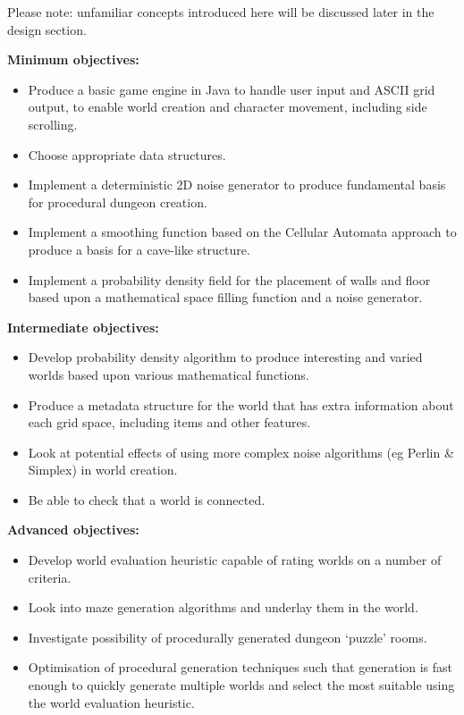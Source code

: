 \documentclass[12pt,a4paper]{article}
\begin{document}
Please note: unfamiliar concepts introduced here will be discussed later in the design section.

\textbf{Minimum objectives:}

\begin{itemize}%

	\item Produce a basic game engine in Java to handle user input and ASCII grid output, to enable world creation and character movement, including side scrolling.
	\item Choose appropriate data structures.
	\item Implement a deterministic 2D noise generator to produce fundamental basis for procedural dungeon creation.
	\item Implement a smoothing function based on the Cellular Automata approach to produce a basis for a cave-like structure.
	\item Implement a probability density field for the placement of walls and floor based upon a mathematical space filling function and a noise generator. 
\end{itemize}
\textbf{Intermediate objectives:}
\begin{itemize}
	\item Develop probability density algorithm to produce interesting and varied worlds based upon various mathematical functions.
	\item Produce a metadata structure for the world that has extra information about each grid space, including items and other features.
	\item Look at potential effects of using more complex noise algorithms (eg Perlin \& Simplex) in world creation.
	\item Be able to check that a world is connected.
\end{itemize}
\textbf{Advanced objectives:}
\begin{itemize}
	
	\item Develop world evaluation heuristic capable of rating worlds on a number of criteria.
	\item Look into maze generation algorithms and underlay them in the world.
	\item Investigate possibility of procedurally generated dungeon `puzzle' rooms.
	\item Optimisation of procedural generation techniques such that generation is fast enough to quickly generate multiple worlds and select the most suitable using the world evaluation heuristic. 
\end{itemize}
\end{document}
